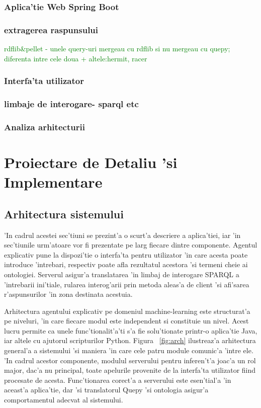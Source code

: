 \documentclass[12pt,a4paper,twoside]{report}
\begin{document}
\subsection{Aplica'tie Web Spring Boot}
\subsection{extragerea raspunsului}
\textcolor{green}{rdflib\&pellet - unele query-uri mergeau cu rdflib si nu mergeau cu quepy; diferenta intre cele doua + altele:hermit, racer}
\subsection{Interfa'ta utilizator}
\subsection{limbaje de interogare- sparql etc}
\subsection{Analiza arhitecturii}


\chapter{Proiectare de Detaliu 'si Implementare}

\section{Arhitectura sistemului}

'In cadrul acestei sec'tiuni se prezint'a o scurt'a descriere a aplica'tiei, iar 'in sec'tiunile urm'atoare vor fi prezentate pe larg fiecare dintre componente. Agentul explicativ pune la dispozi'tie o interfa'ta pentru utilizator 'in care acesta poate introduce 'intrebari, respectiv poate afla rezultatul acestora 'si termeni cheie ai ontologiei. Serverul asigur'a translatarea 'in limbaj de interogare SPARQL a 'intrebarii ini'tiale, rularea interog'arii prin metoda aleas'a de client 'si afi'sarea r'aspunsurilor 'in zona destinata acestuia.

Arhitectura agentului explicativ pe domeniul machine-learning este structurat'a pe niveluri, 'in care fiecare modul este independent si constituie un nivel. Acest lucru permite ca unele func'tionalit'a'ti s'a fie solu'tionate printr-o aplica'tie Java, iar altele cu ajutorul scripturilor Python. Figura ~\ref{fig:arch} ilustreaz'a arhitectura general'a a sistemului 'si maniera 'in care cele patru module comunic'a 'intre ele. 'In cadrul acestor componente, modulul serverului pentru inferen't'a joac'a un rol major, dac'a nu principal, toate apelurile provenite de la interfa'ta utilizator fiind procesate de acesta. Func'tionarea corect'a a serverului este esen'tial'a 'in aceast'a aplica'tie, dar 'si translatorul Quepy 'si ontologia asigur'a comportamentul adecvat al sistemului.
\end{document}
